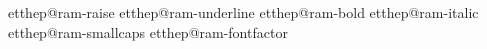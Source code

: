 \x@\let\csname getthep@ram-raise\endcsname\getthep@ramObeyRegularTop
\x@\let\csname getthep@ram-underline\endcsname\getthep@ramObeyRegularTop
\x@\let\csname getthep@ram-bold\endcsname\getthep@ramObeyRegularTop
\x@\let\csname getthep@ram-italic\endcsname\getthep@ramObeyRegularTop
\x@\let\csname getthep@ram-smallcaps\endcsname\getthep@ramObeyRegularTop
\x@\let\csname getthep@ram-fontfactor\endcsname\getthep@ramObeyRegularTop

\def\getmcp@ram#1{\getp@ram{#1}{\styst@kfirst}{\styst@k}}
\def\getmcp@ramR#1{\getp@ram{#1}{\styst@kfirst}{\styst@k}}

\def\getFp@ram#1#2#3{%
  \let\p@ram\relax
  \def\d@##1+##2+##3\E{\d@code{##1}{##2}\edef\tmpa{#2}\ifx\tmp\tmpa\getmcp@ram{#1}\else\getp@ram{#1}{#2}{#2}\fi}%
  \mctop\ifnotracestacks\poptracing\fi}
\def\getFp@ramR#1#2#3{\ifnotracestacks\pushtracing\fi
  \def\d@##1+##2+##3\E{\d@code{##1}{##2}\edef\tmpa{#2}\ifx\tmp\tmpa\getmcp@ramR{#1}\else\getp@ram{#1}{#2}{#2}\fi}%
  \mctop\ifnotracestacks\poptracing\fi}



